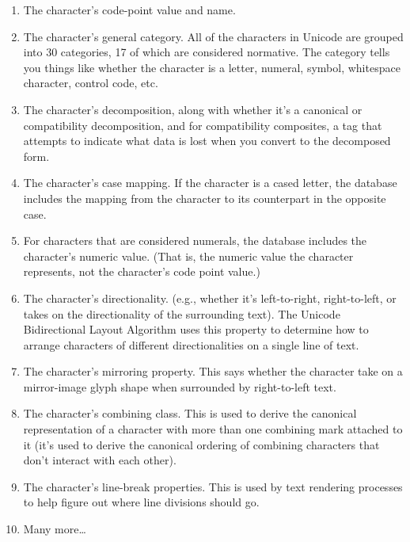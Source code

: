 \begin{enumerate}
\item The character’s code-point value and name.

\item The character’s general category. All of the characters in Unicode are grouped into 30 categories,
17 of which are considered normative. The category tells you things like whether the character is
a letter, numeral, symbol, whitespace character, control code, etc.

\item The character’s decomposition, along with whether it’s a canonical or compatibility
decomposition, and for compatibility composites, a tag that attempts to indicate what data is lost
when you convert to the decomposed form.

\item The character’s case mapping. If the character is a cased letter, the database includes the mapping
from the character to its counterpart in the opposite case.

\item For characters that are considered numerals, the database includes the character’s numeric value.
(That is, the numeric value the character represents, not the character’s code point value.)

\item The character’s directionality. (e.g., whether it’s left-to-right, right-to-left, or takes on the
directionality of the surrounding text). The Unicode Bidirectional Layout Algorithm uses this
property to determine how to arrange characters of different directionalities on a single line of
text.

\item The character’s mirroring property. This says whether the character take on a mirror-image glyph
shape when surrounded by right-to-left text.

\item The character’s combining class. This is used to derive the canonical representation of a character
with more than one combining mark attached to it (it’s used to derive the canonical ordering of
combining characters that don’t interact with each other).

\item The character’s line-break properties. This is used by text rendering processes to help figure out
where line divisions should go.

\item  Many more… 
\end{enumerate}


